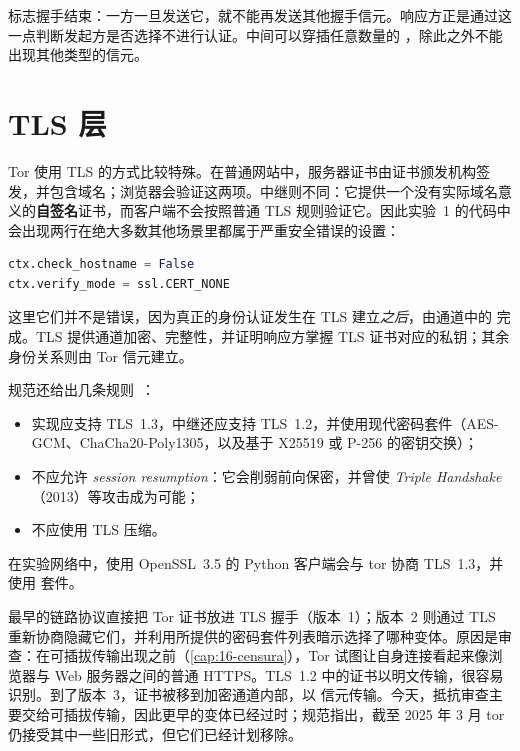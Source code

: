  标志握手结束：一方一旦发送它，就不能再发送其他握手信元。响应方正是通过这一点判断发起方是否选择不进行认证。中间可以穿插任意数量的 ，除此之外不能出现其他类型的信元。

\section{TLS 层}\label{sec:canale-tls}

Tor 使用 TLS 的方式比较特殊。在普通网站中，服务器证书由证书颁发机构签发，并包含域名；浏览器会验证这两项。中继则不同：它提供一个没有实际域名意义的\textbf{自签名}证书，而客户端不会按照普通 TLS 规则验证它。因此实验~1 的代码中会出现两行在绝大多数其他场景里都属于严重安全错误的设置：

\begin{lstlisting}[language=Python,numbers=none]
ctx.check_hostname = False
ctx.verify_mode = ssl.CERT_NONE
\end{lstlisting}

这里它们并不是错误，因为真正的身份认证发生在 TLS 建立\emph{之后}，由通道中的  完成。TLS 提供通道加密、完整性，并证明响应方掌握 TLS 证书对应的私钥；其余身份关系则由 Tor 信元建立。

规范还给出几条规则~：
\begin{itemize}
  \item 实现应支持 TLS~1.3，中继还应支持 TLS~1.2，并使用现代密码套件（AES-GCM、ChaCha20-Poly1305，以及基于 X25519 或 P-256 的密钥交换）；
  \item 不应允许 \emph{session resumption}：它会削弱前向保密，并曾使 \emph{Triple Handshake}（2013）等攻击成为可能；
  \item 不应使用 TLS 压缩。
\end{itemize}

在实验网络中，使用 OpenSSL~3.5 的 Python 客户端会与 tor 协商 TLS~1.3，并使用  套件。

\begin{storia}[为什么握手如此特殊？]
最早的链路协议直接把 Tor 证书放进 TLS 握手（版本~1）；版本~2 则通过 TLS 重新协商隐藏它们，并利用所提供的密码套件列表暗示选择了哪种变体。原因是审查：在可插拔传输出现之前（\cref{cap:16-censura}），Tor 试图让自身连接看起来像浏览器与 Web 服务器之间的普通 HTTPS。TLS~1.2 中的证书以明文传输，很容易识别。到了版本~3，证书被移到加密通道内部，以  信元传输。今天，抵抗审查主要交给可插拔传输，因此更早的变体已经过时；规范指出，截至 2025 年 3 月 tor 仍接受其中一些旧形式，但它们已经计划移除。
\end{storia}

